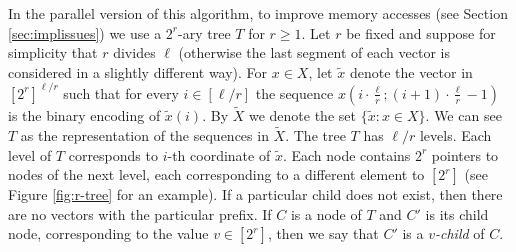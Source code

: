 \documentclass[a4paper]{article}
\begin{document}
In the parallel version of this algorithm, to improve memory accesses (see Section \ref{sec:implissues}) we use a $2^r$-ary tree $T$ for $r \geq 1$. Let $r$ be fixed and suppose for simplicity that $r$ divides $\ell$ (otherwise the last segment of each vector is considered in a slightly different way).
For $x \in X$, let $\widetilde x$ denote the vector in $[2^r]^{\ell/r}$ such that for every $i \in [\ell/r]$ the sequence
$x(i \cdot \frac{\ell}{r} ; (i+1) \cdot \frac{\ell}{r}-1)$ is the binary encoding of $\widetilde x(i)$. By $\widetilde X$ we denote the set $\{\widetilde x \colon x \in X\}$. We can see $T$ as the representation of the sequences in  $\widetilde X$. 
The tree $T$ has $\ell/r$ levels. Each level of $T$ corresponds to $i$-th coordinate of $\widetilde x$.
Each node contains $2^r$ pointers to nodes of the next level, each corresponding to a different element to $[2^r]$ (see Figure \ref{fig:r-tree} for an example).
If a particular child does not exist, then there are no vectors with the particular prefix. If $C$ is a node of $T$ and $C'$ is its child node, corresponding to the value $v \in [2^r]$, then we say that $C'$ is a {\em $v$-child} of $C$.
\end{document}
